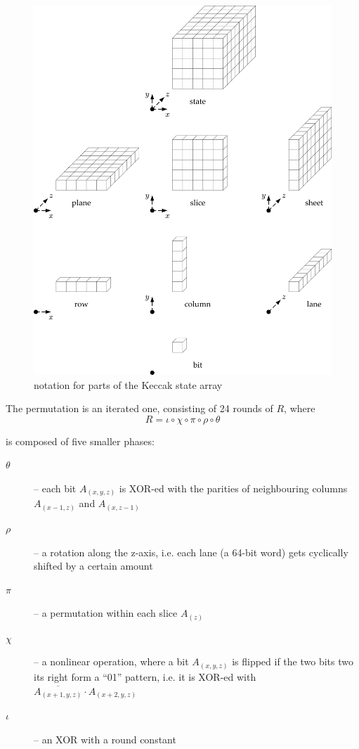 \documentclass[times, utf8, diplomski]{fer}
\begin{document}
\begin{figure}[htb]
    \centering
    \includegraphics{images/keccak_state.png}
    \caption{notation for parts of the Keccak state array}
    \label{fig:keccak_state}
\end{figure}

The permutation is an iterated one, consisting of 24 rounds of $R$, where
\begin{equation*}
  R = \iota \circ \chi \circ \pi \circ \rho \circ \theta
\end{equation*}

is composed of five smaller phases:
\begin{description}
    \item[$\theta$] -- each bit $A_{(x,y,z)}$ is XOR-ed with the parities of
        neighbouring columns $A_{(x-1,z)}$ and $A_{(x,z-1)}$
    \item[$\rho$] -- a rotation along the z-axis, i.e. each lane (a 64-bit word)
        gets cyclically shifted by a certain amount
    \item[$\pi$] -- a permutation within each slice $A_{(z)}$
    \item[$\chi$] -- a nonlinear operation, where a bit $A_{(x,y,z)}$ is flipped
        if the two bits two its right form a ``01'' pattern, i.e. it is XOR-ed
        with $\overline{A_{(x+1,y,z)}} \cdot A_{(x+2,y,z)}$
    \item[$\iota$] -- an XOR with a round constant
\end{description}
\end{document}
